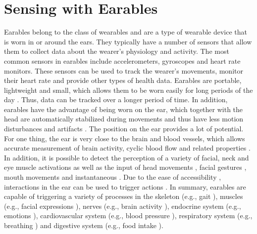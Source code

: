\section{Sensing with Earables}
\label{Background:SensingWithEarables}
Earables belong to the class of wearables and are a type of wearable device that is worn in or around the ears. 
They typically have a number of sensors that allow them to collect data about the wearer's physiology and activity. 
The most common sensors in earables include accelerometers, gyroscopes and heart rate monitors. 
These sensors can be used to track the wearer's movements, monitor their heart rate and provide other types of health data.
Earables are portable, lightweight and small, which allows them to be worn easily for long periods of the day \cite{roddigerSensingEarablesSystematic2022a}. 
Thus, data can be tracked over a longer period of time. In addition, earables have the advantage of being worn on the ear, which together with the head are automatically stabilized during movements and thus have less motion disturbances and artifacts \cite{grossmanFrequencyVelocityRotational1988, kavanaghRoleNeckTrunk2006a}.
The position on the ear provides a lot of potential. 
For one thing, the ear is very close to the brain and blood vessels, which allows accurate measurement of brain activity, cyclic blood flow and related properties \cite{ferliniInEarPPGVital2022}.
In addition, it is possible to detect the perception of a variety of facial, neck and eye muscle activations \cite{andoCanalSenseFaceRelatedMovement2017} as well as the input of head movements \cite{andoCanalSenseFaceRelatedMovement2017}, facial gestures \cite{matthiesEarFieldSensingNovelInEar2017}, mouth movements \cite{sunTeethTapRecognizingDiscrete2021a} and instantaneous \cite{bleichnerConcealedUnobtrusiveEarCentered2017, phamWAKEBehindtheearWearable2020}. 
Due to the ease of accessibility \cite{kikuchiEarTouchTurningEar2017, xuEarBuddyEnablingOnFace2020}, interactions in the ear can be used to trigger actions \cite{lissermannEarPutAugmentingEarworn2014}.
In summary, earables are capable of triggering a variety of processes in the skeleton (e.g., gait \cite{atallahGaitAsymmetryDetection2014}), muscles (e.g., facial expressions \cite{matthiesEarFieldSensingNovelInEar2017}), nerves (e.g., brain activity \cite{debenerUnobtrusiveAmbulatoryEEG2015}), endocrine system (e.g., emotions \cite{athavipachWearableInEarEEG2019}), cardiovascular system (e.g., blood pressure \cite{atallahValidationEarwornSensor2012}), respiratory system (e.g., breathing \cite{roddigerRespirationRateMonitoring2020}) and digestive system (e.g., food intake \cite{gaoIHearFoodEating2016}).

